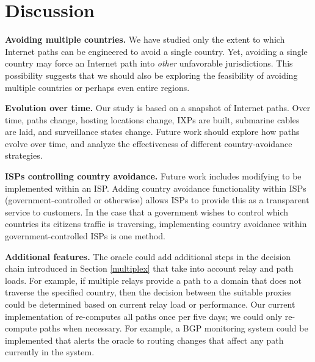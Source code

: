 \section{Discussion}
\label{sec:discussion}

\textbf{Avoiding multiple countries.} 
We have studied only the extent to which Internet paths can be
engineered to avoid a {single} country.  Yet, avoiding a single country
may force an Internet path into {\em other} unfavorable
jurisdictions. This possibility suggests that we should also be
exploring the feasibility of avoiding multiple countries or perhaps even entire regions. 

\textbf{Evolution over time.}
Our study is based on a snapshot of Internet paths. Over time, paths
change, hosting locations change, IXPs are built, submarine cables are
laid, and surveillance states change.  Future work should explore how
paths evolve over time, and analyze the effectiveness of different
country-avoidance strategies.


\textbf{ISPs controlling country avoidance.} 
Future work includes modifying \system{} to be implemented within an 
ISP.  Adding country avoidance functionality within ISPs 
(government-controlled or otherwise) allows ISPs to provide this as a transparent
service to customers.  In the case that a government wishes to control which countries its citizens 
traffic is traversing, implementing country avoidance within government-controlled
ISPs is one method.

\textbf{Additional \system{} features.}  
The oracle could add additional steps in the decision
chain introduced in Section \ref{multiplex} that take into account
relay and path loads.  For example, if multiple relays provide a path
to a domain that does not traverse the specified country, then the
decision between the suitable proxies could be determined based on
current relay load or performance.  Our current implementation of
\system{} re-computes all paths once per five days; we could only
re-compute paths when necessary.  For example, a BGP monitoring system
could be implemented that alerts the oracle to routing changes that
affect any path currently in the system.

